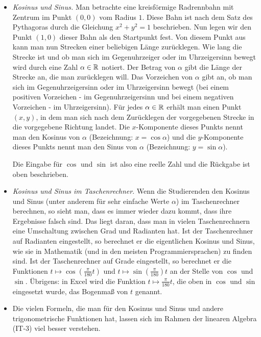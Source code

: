 \begin{bem}
\begin{itemize}
		\item \emph{Kosinus und Sinus.}  Man betrachte eine kreisförmige Radrennbahn mit Zentrum im Punkt $(0,0)$ vom Radius $1$. Diese Bahn ist nach dem Satz des Pythagoras durch die Gleichung $x^2 + y^2 = 1$ beschrieben. Nun legen wir den Punkt $(1,0)$ dieser Bahn als den Startpunkt fest. Von diesem Punkt aus kann man nun Strecken einer beliebigen Länge zurücklegen. Wie lang die Strecke ist und ob man sich im Gegenuhrzeiger oder im Uhrzeigersinn bewegt wird durch eine Zahl $\alpha \in \mathbb{R}$ notiert. Der Betrag von $\alpha$ gibt die Länge der Strecke an, die man zurücklegen will. Das Vorzeichen von $\alpha$ gibt an, ob man sich im Gegenuhrzeigersinn oder im Uhrzeigersinn bewegt (bei einem positiven Vorzeichen - im Gegenuhrzeigersinn und bei einem negativen Vorzeichen - im Uhrzeigersinn). Für jedes $\alpha \in \mathbb{R}$ erhält man einen Punkt $(x,y)$, in dem man sich nach dem Zurücklegen der vorgegebenen Strecke in die vorgegebene Richtung landet. Die $x$-Komponente dieses Punkts nennt man den Kosinus von $\alpha$ (Bezeichnung: $x = \cos \alpha$) und die $y$-Komponente dieses Punkts nennt man den Sinus von $\alpha$ (Bezeichnung: $y = \sin \alpha$). 
		
		Die Eingabe für $\cos$ und $\sin$ ist also eine reelle Zahl und die Rückgabe ist oben beschrieben. 
		\item \emph{Kosinus und Sinus im Taschenrechner}. Wenn die Studierenden den Kosinus und Sinus (unter anderem für sehr einfache Werte $\alpha$) im Taschenrechner berechnen, so sieht man, dass es immer wieder dazu kommt, dass ihre Ergebnisse falsch sind. Das liegt daran, dass man in vielen Taschenrechnern eine Umschaltung zwischen Grad und Radianten hat. Ist der Taschenrechner auf Radianten eingestellt, so berechnet er die eigentlichen  Kosinus und Sinus, wie sie in Mathematik (und in den meisten Programmiersprachen) zu finden sind. Ist der Taschenrechner auf Grade eingestellt, so berechnet er die Funktionen $t \mapsto \cos( \frac{\pi}{180}t)$ und $t \mapsto \sin( \frac{\pi}{180})t$ an der Stelle von $\cos$ und $\sin$. Übrigens: in Excel wird die Funktion $t \mapsto \frac{\pi}{180} t$, die oben in $\cos$ und $\sin$ eingesetzt wurde, das Bogenmaß von $t$ genannt. 
		\item Die vielen Formeln, die man für den Kosinus und Sinus und andere trigonometrische Funktionen hat, lassen sich im Rahmen der linearen Algebra (IT-3) viel besser verstehen. 
	\end{itemize} 
\end{bem} 

